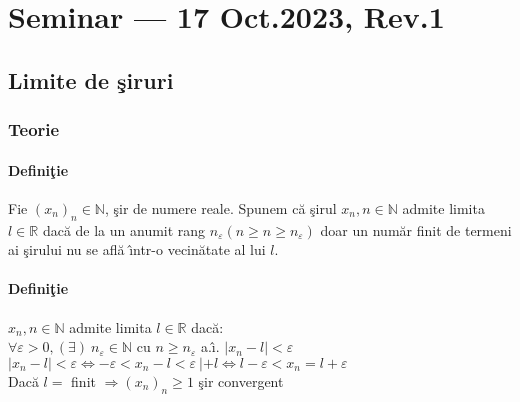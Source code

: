 \documentclass[a4paper, 12pt, notitlepage]{book}
\begin{document}



    \newcommand\revstr{Rev.\@ 1}
    \chapter{Seminar --- 17 Oct.\@ 2023, \revstr}

    \section{Limite de \c{s}iruri}
    \subsection{Teorie}

    \subsubsection{Defini\c{t}ie}
    \quad Fie ${(x_{n})}_{n} \in \mathbb{N}$, \c{s}ir de numere reale. Spunem c\u{a} \c{s}irul $x_n, n \in \mathbb{N}$ admite limita $l \in \mathbb{R}$ dac\u{a} de la un anumit rang $n_{\varepsilon}(n \ge n \ge n_{\varepsilon})$ doar un num\u{a}r finit de termeni ai \c{s}irului nu se afl\u{a} \^{\i}ntr-o vecin\u{a}tate al lui $l$.

    \begin{center}
      
    \end{center}

    \subsubsection{Defini\c{t}ie}
    $x_{n}, n \in \mathbb{N}$ admite limita $l \in \mathbb{R}$ dac\u{a}:\\[5pt]
    $\forall \varepsilon > 0, (\exists)\ n_{\varepsilon} \in \mathbb{N}$ cu $n \ge n_{\varepsilon}$ a.\^{\i}. $\lvert x_{n} - l \rvert < \varepsilon$\\[5pt]
    $\lvert x_{n} - l \rvert < \varepsilon \Leftrightarrow -\varepsilon < x_{n} - l < \varepsilon\ | + l \Leftrightarrow l - \varepsilon < x_{n} = l + \varepsilon$\\[5pt]
    Dac\u{a} $l =$ finit $\Rightarrow {(x_{n})}_{n} \ge 1$ \c{s}ir convergent
\end{document}
